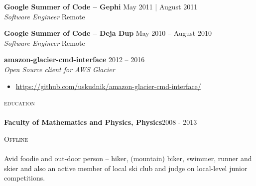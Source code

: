 \documentclass[a4paper]{article}
\newcommand{\lineunder} {
    \vspace*{-8pt} \\
    \hspace*{-18pt} {\color{Mahogany} \hrulefill} \\
}
\newcommand{\header} [1] {
    \vspace{4mm}
    {\hspace*{-18pt}\vspace*{6pt} \large \textsc{\textcolor{Mahogany}{#1}}}
    \vspace*{-6pt} \lineunder
}
\begin{document}


\textbf{Google Summer of Code – Gephi}  \hfill May 2011 | August 2011 \\
\textit{Software Engineer} \hfill Remote \\
\vspace{2mm}



\textbf{Google Summer of Code – Deja Dup} \hfill May 2010 – August 2010\\
\textit{Software Engineer} \hfill Remote \\

\vspace{2mm}

\textbf{amazon-glacier-cmd-interface} \hfill 2012 – 2016\\
\textit{Open Source client for AWS Glacier}
\begin{itemize}
    \item \url{https://github.com/uskudnik/amazon-glacier-cmd-interface/}
\end{itemize}



\header{education}
\textbf{Faculty of Mathematics and Physics, Physics}\hfill 2008 - 2013\\
\vspace{2mm}

\header{Offline}
Avid foodie and out-door person – hiker, (mountain) biker, swimmer, runner and skier and also an active member of local
ski club and judge on local-level junior competitions.
\vspace*{2mm}

\
\end{document}
